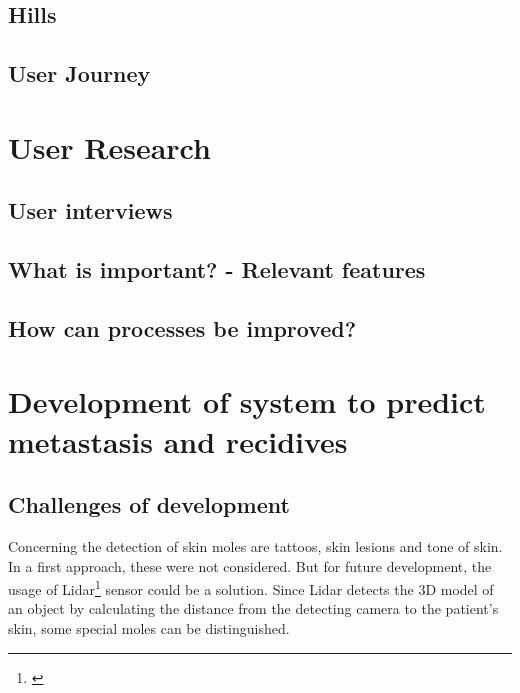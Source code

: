 \subsection{Hills}


\subsection{User Journey}


\section{User Research}
\subsection{User interviews}
\subsection{What is important? - Relevant features}
\subsection{How can processes be improved?}


\section{Development of system to predict metastasis and recidives} 

\subsection{Challenges of development}
Concerning the detection of skin moles are tattoos, skin lesions and tone of skin. In a first approach, these were not considered. But for future development, the usage of Lidar\footnote{\cite{czichos_introduction_2018}} sensor could be a solution. Since Lidar detects the 3D model of an object by calculating the distance from the detecting camera to the patient's skin, some special moles can be distinguished. 

